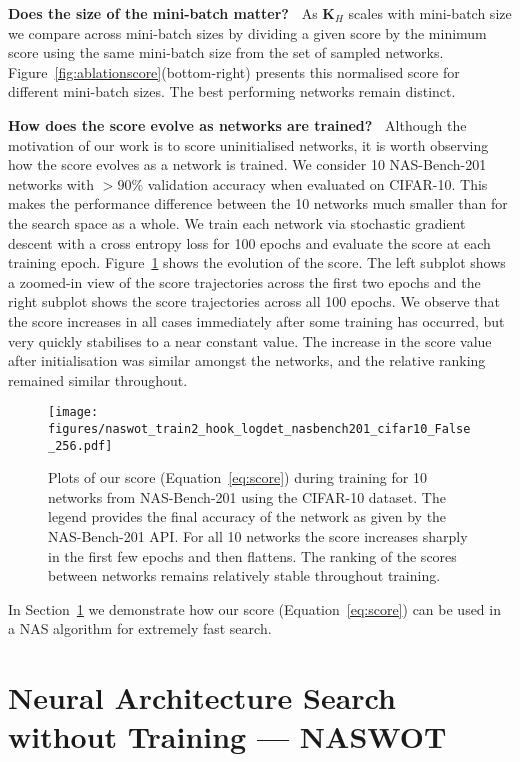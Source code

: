 \documentclass{article}
\newcommand{\matr}[1]{\mathbf{#1}}
\begin{document}
\textbf{Does the size of the mini-batch matter?\ } As $\matr{K}_H$ scales with mini-batch size we compare across mini-batch sizes by dividing a given score by the minimum score using the same mini-batch size from the set of sampled networks.  
Figure~\ref{fig:ablationscore}(bottom-right)
presents this normalised score for different mini-batch sizes. The best performing networks remain distinct.



\textbf{How does the score evolve as networks are trained?\ } Although the motivation of our work is to score uninitialised networks, it is worth observing how the score evolves as a network is trained. 
We consider 10 NAS-Bench-201 networks with $>90\%$ validation accuracy when evaluated on CIFAR-10. This makes the performance difference between the 10 networks much smaller than for the search space as a whole. 
We train each network via stochastic gradient descent with a cross entropy loss for 100 epochs and evaluate the score at each training epoch. Figure~\ref{fig:scoretraj} shows the evolution of the score. The left subplot shows a zoomed-in view of the score trajectories across the first two epochs and the right subplot shows the score trajectories across all 100 epochs. 
We observe that the score increases in all cases immediately after some training has occurred, but very quickly stabilises to a near constant value. The increase in the score value after initialisation was similar amongst the networks, and the relative ranking remained similar throughout. 


\begin{figure}[!h]
                \texttt{[image: figures/naswot\_train2\_hook\_logdet\_nasbench201\_cifar10\_False\_256.pdf]}
\caption{Plots of our score (Equation~\ref{eq:score}) during training for 10 networks from NAS-Bench-201 using the CIFAR-10 dataset. The legend provides the final accuracy of the network as given by the NAS-Bench-201 API. For all 10 networks the score increases sharply in the first few epochs and then flattens. The ranking of the scores between networks remains relatively stable throughout training.}
\label{fig:scoretraj}
\end{figure}

In Section~\ref{sec:nas} we demonstrate how our score (Equation~\ref{eq:score}) can be used in a NAS algorithm for extremely fast search.





\section{Neural Architecture Search without Training --- NASWOT}
\label{sec:nas}
\end{document}
